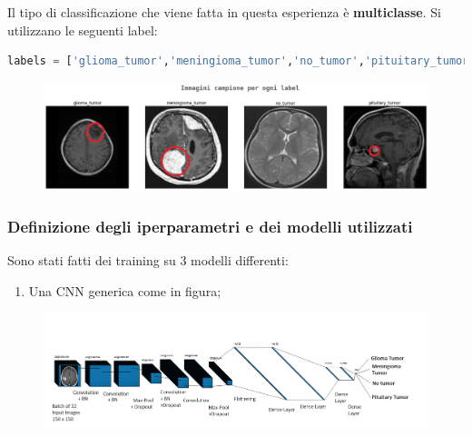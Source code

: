 \documentclass{beamer}
\begin{document}
\begin{frame}[fragile]
Il tipo di classificazione che viene fatta in questa esperienza è \textbf{multiclasse}.
Si utilizzano le seguenti label:
\begin{lstlisting}[basicstyle=\tiny, language = Python, numbers = none]
	labels = ['glioma_tumor','meningioma_tumor','no_tumor','pituitary_tumor']
\end{lstlisting}
\begin{figure}
	\includegraphics[width=1\textwidth]{brain-samples.png}
\end{figure}

\end{frame}


\begin{frame}
	\frametitle{Definizione degli iperparametri e dei modelli utilizzati}
	Sono stati fatti dei training su 3 modelli differenti:
	\begin{enumerate}
		\item Una CNN generica come in figura;	
	\end{enumerate}
		\begin{figure}
			\includegraphics[width=1.1\textwidth]{BT-first.PNG}
		\end{figure}
		
	
\end{frame}
\end{document}
